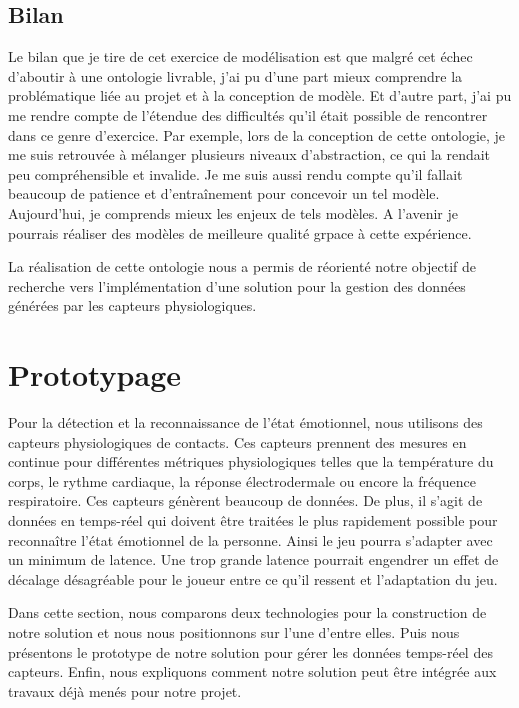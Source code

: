 \documentclass{article}
\begin{document}
	\subsection{Bilan}\label{sec:modelbilan}
		Le bilan que je tire de cet exercice de modélisation est que malgré cet échec d'aboutir à une ontologie livrable, j'ai pu d'une part mieux comprendre la problématique liée au projet et à la conception de modèle.
		Et d'autre part, j'ai pu me rendre compte de l'étendue des difficultés qu'il était possible de rencontrer dans ce genre d'exercice.
		Par exemple, lors de la conception de cette ontologie, je me suis retrouvée à mélanger plusieurs niveaux d'abstraction, ce qui la rendait peu compréhensible et invalide. 
		Je me suis aussi rendu compte qu'il fallait beaucoup de patience et d'entraînement pour concevoir un tel modèle. 
		Aujourd'hui, je comprends mieux les enjeux de tels modèles. 
		A l'avenir je pourrais réaliser des modèles de meilleure qualité grpace à cette expérience.\par
		La réalisation de cette ontologie nous a permis de réorienté notre objectif de recherche vers l'implémentation d'une solution pour la gestion des données générées par les capteurs physiologiques.

\section{Prototypage}\label{sec:prototypage}
	Pour la détection et la reconnaissance de l'état émotionnel, nous utilisons des capteurs physiologiques de contacts.
	Ces capteurs prennent des mesures en continue pour différentes métriques physiologiques telles que la température du corps, le rythme cardiaque, la réponse électrodermale ou encore la fréquence respiratoire.
	Ces capteurs génèrent beaucoup de données.
	De plus, il s'agit de données en temps-réel qui doivent être traitées le plus rapidement possible pour reconnaître l'état émotionnel de la personne.
	Ainsi le jeu pourra s'adapter avec un minimum de latence.
	Une trop grande latence pourrait engendrer un effet de décalage désagréable pour le joueur entre ce qu'il ressent et l'adaptation du jeu.\par
	Dans cette section, nous comparons deux technologies pour la construction de notre solution et nous nous positionnons sur l'une d'entre elles.
	Puis nous présentons le prototype de notre solution pour gérer les données temps-réel des capteurs.
	Enfin, nous expliquons comment notre solution peut être intégrée aux travaux déjà menés pour notre projet.
\end{document}
